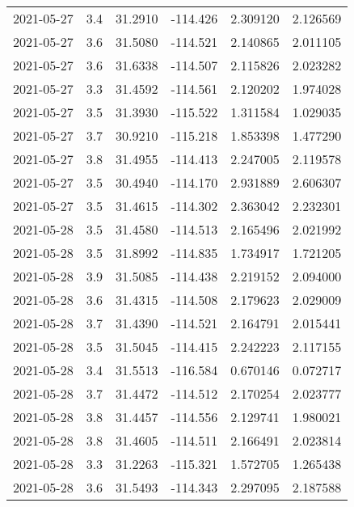 \begin{tabular}{lrrrrr}
2021-05-27 &       3.4 &  31.2910 &  -114.426 &         2.309120 &         2.126569 \\
2021-05-27 &       3.6 &  31.5080 &  -114.521 &         2.140865 &         2.011105 \\
2021-05-27 &       3.6 &  31.6338 &  -114.507 &         2.115826 &         2.023282 \\
2021-05-27 &       3.3 &  31.4592 &  -114.561 &         2.120202 &         1.974028 \\
2021-05-27 &       3.5 &  31.3930 &  -115.522 &         1.311584 &         1.029035 \\
2021-05-27 &       3.7 &  30.9210 &  -115.218 &         1.853398 &         1.477290 \\
2021-05-27 &       3.8 &  31.4955 &  -114.413 &         2.247005 &         2.119578 \\
2021-05-27 &       3.5 &  30.4940 &  -114.170 &         2.931889 &         2.606307 \\
2021-05-27 &       3.5 &  31.4615 &  -114.302 &         2.363042 &         2.232301 \\
2021-05-28 &       3.5 &  31.4580 &  -114.513 &         2.165496 &         2.021992 \\
2021-05-28 &       3.5 &  31.8992 &  -114.835 &         1.734917 &         1.721205 \\
2021-05-28 &       3.9 &  31.5085 &  -114.438 &         2.219152 &         2.094000 \\
2021-05-28 &       3.6 &  31.4315 &  -114.508 &         2.179623 &         2.029009 \\
2021-05-28 &       3.7 &  31.4390 &  -114.521 &         2.164791 &         2.015441 \\
2021-05-28 &       3.5 &  31.5045 &  -114.415 &         2.242223 &         2.117155 \\
2021-05-28 &       3.4 &  31.5513 &  -116.584 &         0.670146 &         0.072717 \\
2021-05-28 &       3.7 &  31.4472 &  -114.512 &         2.170254 &         2.023777 \\
2021-05-28 &       3.8 &  31.4457 &  -114.556 &         2.129741 &         1.980021 \\
2021-05-28 &       3.8 &  31.4605 &  -114.511 &         2.166491 &         2.023814 \\
2021-05-28 &       3.3 &  31.2263 &  -115.321 &         1.572705 &         1.265438 \\
2021-05-28 &       3.6 &  31.5493 &  -114.343 &         2.297095 &         2.187588 \\

\end{tabular}
